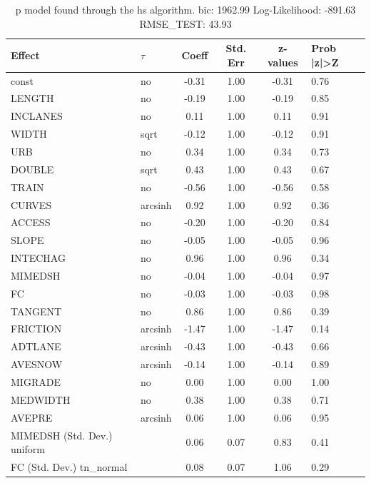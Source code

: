 \begin{table}
	\caption{p model found through the hs algorithm. bic: 1962.99 Log-Likelihood: -891.63 RMSE_TEST: 43.93}
	\begin{center}
		\begin{tabular}{|l|l|c|c|c|l|}
			\hline
			Effect & $\tau$ & Coeff & Std. Err & z-values & Prob |z|>Z \\
			\hline
			const & no & -0.31 & 1.00 & -0.31 & 0.76 \\
			\hline
			LENGTH & no & -0.19 & 1.00 & -0.19 & 0.85 \\
			\hline
			INCLANES & no & 0.11 & 1.00 & 0.11 & 0.91 \\
			\hline
			WIDTH & sqrt & -0.12 & 1.00 & -0.12 & 0.91 \\
			\hline
			URB & no & 0.34 & 1.00 & 0.34 & 0.73 \\
			\hline
			DOUBLE & sqrt & 0.43 & 1.00 & 0.43 & 0.67 \\
			\hline
			TRAIN & no & -0.56 & 1.00 & -0.56 & 0.58 \\
			\hline
			CURVES & arcsinh & 0.92 & 1.00 & 0.92 & 0.36 \\
			\hline
			ACCESS & no & -0.20 & 1.00 & -0.20 & 0.84 \\
			\hline
			SLOPE & no & -0.05 & 1.00 & -0.05 & 0.96 \\
			\hline
			INTECHAG & no & 0.96 & 1.00 & 0.96 & 0.34 \\
			\hline
			MIMEDSH & no & -0.04 & 1.00 & -0.04 & 0.97 \\
			\hline
			FC & no & -0.03 & 1.00 & -0.03 & 0.98 \\
			\hline
			TANGENT & no & 0.86 & 1.00 & 0.86 & 0.39 \\
			\hline
			FRICTION & arcsinh & -1.47 & 1.00 & -1.47 & 0.14 \\
			\hline
			ADTLANE & arcsinh & -0.43 & 1.00 & -0.43 & 0.66 \\
			\hline
			AVESNOW & arcsinh & -0.14 & 1.00 & -0.14 & 0.89 \\
			\hline
			MIGRADE & no & 0.00 & 1.00 & 0.00 & 1.00 \\
			\hline
			MEDWIDTH & no & 0.38 & 1.00 & 0.38 & 0.71 \\
			\hline
			AVEPRE & arcsinh & 0.06 & 1.00 & 0.06 & 0.95 \\
			\hline
			MIMEDSH (Std. Dev.) uniform &  & 0.06 & 0.07 & 0.83 & 0.41 \\
			\hline
			FC (Std. Dev.) tn_normal &  & 0.08 & 0.07 & 1.06 & 0.29 \\

\end{tabular}
\end{center}
\end{table}
